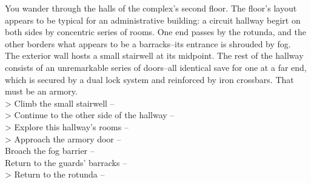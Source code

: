 You wander through the halls of the complex’s second floor. The floor's layout appears to be typical for an administrative building: a circuit hallway begirt on both sides by concentric series of rooms. One end passes by the rotunda, and the other borders what appears to be a barracks--its entrance is shrouded by fog.\\

The exterior wall hosts a small stairwell at its midpoint. The rest of the hallway consists of an unremarkable series of doors--all identical save for one at a far end, which is secured by a dual lock system and reinforced by iron crossbars. That must be an armory.\\

> Climb the small stairwell -- \\
> Continue to the other side of the hallway -- \\
> Explore this hallway's rooms -- \\
> Approach the armory door -- \\
 Broach the fog barrier -- \\
 Return to the guards' barracks -- \\
> Return to the rotunda -- 